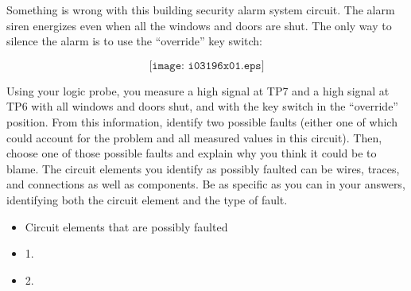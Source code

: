 

Something is wrong with this building security alarm system circuit.  The alarm siren energizes even when all the windows and doors are shut.  The only way to silence the alarm is to use the ``override'' key switch:

$$\texttt{[image: i03196x01.eps]}$$

Using your logic probe, you measure a high signal at TP7 and a high signal at TP6 with all windows and doors shut, and with the key switch in the ``override'' position.  From this information, identify two possible faults (either one of which could account for the problem and all measured values in this circuit).  Then, choose one of those possible faults and explain why you think it could be to blame.  The circuit elements you identify as possibly faulted can be wires, traces, and connections as well as components.  Be as specific as you can in your answers, identifying both the circuit element and the type of fault.

\begin{itemize}
\goodbreak
\item{} Circuit elements that are possibly faulted
\item{1.}
\item{2.} 
\end{itemize}

